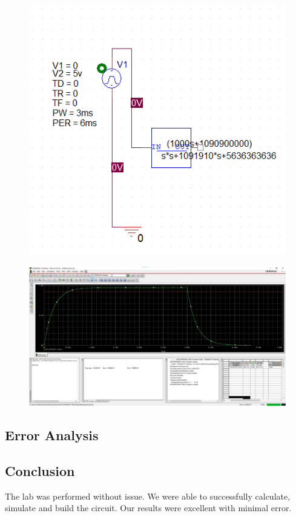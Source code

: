 \documentclass[11pt]{article}
\begin{document}
		\begin{figure}[H]
		\centering
		\includegraphics[width=5in]{images/simulation_schematic.png}
		\end{figure}
		\begin{figure}[H]
		\centering
		\includegraphics[width=5in]{images/laplace_part.png}
		\end{figure}
	

	\subsection*{Error Analysis}
	
	\subsection*{Conclusion}
	The lab was performed without issue. We were able to successfully calculate, simulate and build the circuit. Our results were excellent with minimal error. 
	
	
\end{document}
